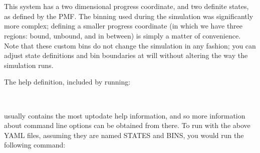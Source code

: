 \documentclass[letterpaper,10pt,english]{sphinxmanual}
\begin{document}
\begin{sphinxVerbatim}[commandchars=\\\{\}]
    
       \PYG{p}{[}\PYG{p}{]}
    
       \PYG{p}{[}\PYG{p}{]}

   
   \PYG{p}{[}\PYG{p}{[}\PYG{p}{]}\PYG{p}{[}\PYG{p}{]}\PYG{p}{]}
\end{sphinxVerbatim}

This system has a two dimensional progress coordinate, and two definite states,
as defined by the PMF. The binning used during the simulation was significantly
more complex; defining a smaller progress coordinate (in which we have three
regions: bound, unbound, and in between) is simply a matter of convenience.
Note that these custom bins do not change the simulation in any fashion; you
can adjust state definitions and bin boundaries at will without altering the
way the simulation runs.

The help definition, included by running:

\begin{sphinxVerbatim}[commandchars=\\\{\}]
 
\end{sphinxVerbatim}

usually contains the most up\sphinxhyphen{}to\sphinxhyphen{}date help information, and so more
information about command line options can be obtained from there. To
run with the above YAML files, assuming they are named STATES and BINS,
you would run the following command:

\begin{sphinxVerbatim}[commandchars=\\\{\}]
    
\end{sphinxVerbatim}
\end{document}
